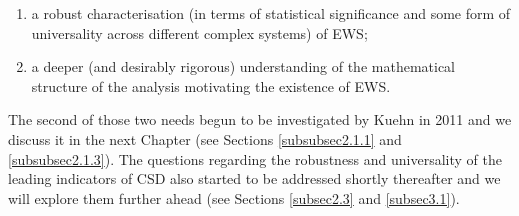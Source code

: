 \documentclass[../main.tex]{subfiles}
\begin{document}
\begin{enumerate}
     \item a robust characterisation (in terms of statistical significance and some form of universality across different complex systems) of EWS;
     \item a deeper (and desirably rigorous) understanding of the mathematical structure of the analysis motivating the existence of EWS.
\end{enumerate}
The second of those two needs begun to be investigated by Kuehn in 2011 \cite{Kuehn11} and we discuss it in the next Chapter (see Sections \ref{subsubsec2.1.1} and \ref{subsubsec2.1.3}). The questions regarding the robustness and universality of the leading indicators of CSD also started to be addressed shortly thereafter and we will explore them further ahead (see Sections \ref{subsec2.3} and \ref{subsec3.1}).
\end{document}
